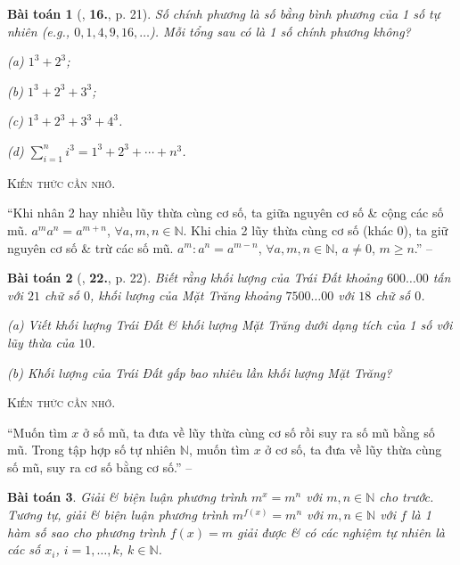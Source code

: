 \documentclass{article}
\numberwithin{equation}{section}
\newtheorem{baitoan}{Bài toán}[section]
\begin{document}
\begin{baitoan}[\cite{Trong_Toan_6_2021}, \textbf{16.}, p. 21]
	\emph{Số chính phương} là số bằng bình phương của 1 số tự nhiên (e.g., $0,1,4,9,16,\ldots$). Mỗi tổng sau có là 1 số chính phương không?
	\begin{enumerate*}
		\item[(a)] $1^3 + 2^3$;
		\item[(b)] $1^3 + 2^3 + 3^3$;
		\item[(c)] $1^3 + 2^3 + 3^3 + 4^3$.
		\item[(d)] $\sum_{i=1}^n i^3 = 1^3 + 2^3 + \cdots + n^3$.
	\end{enumerate*}
\end{baitoan}
\noindent\textsc{Kiến thức cần nhớ.}
\begin{tcolorbox}
	``Khi nhân 2 hay nhiều lũy thừa cùng cơ số, ta giữa nguyên cơ số \& cộng các số mũ. $a^ma^n = a^{m + n}$, $\forall a,m,n\in\mathbb{N}$. Khi chia 2 lũy thừa cùng cơ số (khác $0$), ta giữ nguyên cơ số \& trừ các số mũ. $a^m:a^n = a^{m-n}$, $\forall a,m,n\in\mathbb{N}$, $a\ne 0$, $m\ge n$.'' -- \cite[p. 22]{Trong_Toan_6_2021}
\end{tcolorbox}

\begin{baitoan}[\cite{Trong_Toan_6_2021}, \textbf{22.}, p. 22]
	Biết rằng khối lượng của Trái Đất khoảng $600\ldots 00$ tấn với $21$ chữ số $0$, khối lượng của Mặt Trăng khoảng $7500\ldots 00$ với $18$ chữ số $0$.
	\begin{enumerate*}
		\item[(a)] Viết khối lượng Trái Đất \& khối lượng Mặt Trăng dưới dạng tích của 1 số với lũy thừa của $10$.
		\item[(b)] Khối lượng của Trái Đất gấp bao nhiêu lần khối lượng Mặt Trăng?
	\end{enumerate*}
\end{baitoan}
\noindent\textsc{Kiến thức cần nhớ.}
\begin{tcolorbox}
	``Muốn tìm $x$ ở số mũ, ta đưa về lũy thừa cùng cơ số rồi suy ra số mũ bằng số mũ. Trong tập hợp số tự nhiên $\mathbb{N}$, muốn tìm $x$ ở cơ số, ta đưa về lũy thừa cùng số mũ, suy ra cơ số bằng cơ số.'' -- \cite[p. 22]{Trong_Toan_6_2021}
\end{tcolorbox}

\begin{baitoan}
	Giải \& biện luận phương trình $m^x = m^n$ với $m,n\in\mathbb{N}$ cho trước. Tương tự, giải \& biện luận phương trình $m^{f(x)} = m^n$ với $m,n\in\mathbb{N}$ với $f$ là 1 hàm số sao cho phương trình $f(x) = m$ giải được \& có các nghiệm tự nhiên là các số $x_i$, $i = 1,\ldots,k$, $k\in\mathbb{N}$.
\end{baitoan}
\end{document}
